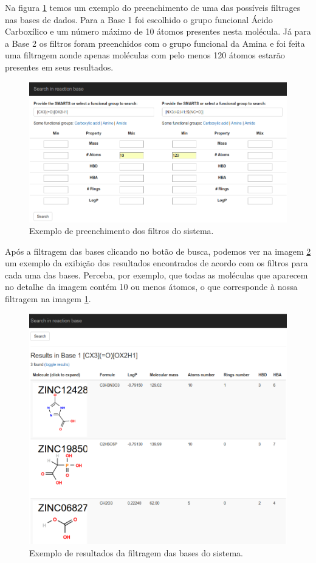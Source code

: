 \documentclass{abnt}
\begin{document}
Na figura \ref{fig:react2} temos um exemplo do preenchimento de uma das possíveis
filtrages nas bases de dados. Para a Base 1 foi escolhido o grupo funcional Ácido
Carboxílico e um número máximo de 10 átomos presentes nesta molécula. Já para a
Base 2 os filtros foram preenchidos com o grupo funcional da Amina e foi feita uma
filtragem aonde apenas moléculas com pelo menos 120 átomos estarão presentes em
seus resultados.

\begin{figure}[!htb]
  \centering
  \includegraphics[scale=0.5]{reaction2}
  \caption{Exemplo de preenchimento dos filtros do sistema.}
  \label{fig:react2}
\end{figure}

Após a filtragem das bases clicando no botão de busca, podemos ver na imagem \ref{fig:react3}
um exemplo da exibição dos resultados encontrados de acordo com os filtros para
cada uma das bases. Perceba, por exemplo, que todas as moléculas que aparecem no
detalhe da imagem contém 10 ou menos átomos, o que corresponde à nossa filtragem
na imagem \ref{fig:react2}.

\begin{figure}[!htb]
  \centering
  \includegraphics[scale=0.5]{reaction3}
  \caption{Exemplo de resultados da filtragem das bases do sistema.}
  \label{fig:react3}
\end{figure}
\end{document}
